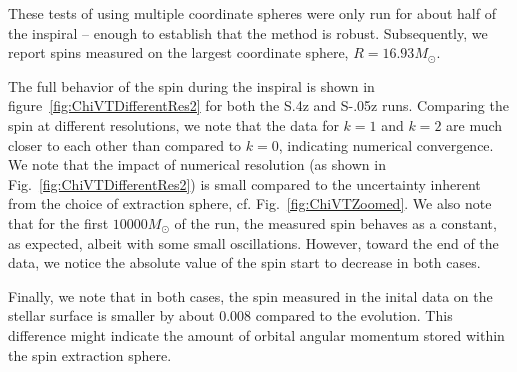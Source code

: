 \documentclass[aps,prd,amsmath,floatfix
,twocolumn
,superscriptaddress,nofootinbib,showpacs]{revtex4-1}
\theoremstyle{plain} \newtheorem{thm}{Theorem} \newtheorem{lem}{Lemma}
\newcommand{\red}[1]{\textcolor{Red}{#1}}
\newcommand{\harald}[1]{{\textcolor{OliveGreen}{#1}}} %
\begin{document}
These tests of using multiple coordinate spheres were only run for
about half of the inspiral -- enough to establish that the method is
robust.  Subsequently, we report spins measured on the largest
coordinate sphere, $R=16.93M_\odot$.

The full behavior of the spin during the inspiral is shown in
figure~\ref{fig:ChiVTDifferentRes2} for both the S.4z and S-.05z runs.
Comparing the spin at different resolutions, we note that the data for
$k\!=\!1$ and $k\!=\!2$ are much closer to each other than compared to
$k\!=\!0$, indicating numerical convergence.  We note that the impact
of numerical resolution (as shown in
Fig.~\ref{fig:ChiVTDifferentRes2}) is small compared to the
uncertainty inherent from the choice of extraction sphere,
cf. Fig.~\ref{fig:ChiVTZoomed}.  We also note that for the first
$10000M_{\odot}$ of the run, the measured spin behaves as a constant,
as expected, albeit with some small oscillations. However, toward the
end of the data, we notice the absolute value of the spin start to
decrease in both cases.  

 
Finally, we note that in both cases, the spin measured in the inital
data on the stellar surface is smaller by about $0.008$ compared to
the evolution.  This difference might indicate the amount of orbital angular momentum stored within the spin extraction sphere.

\end{document}
